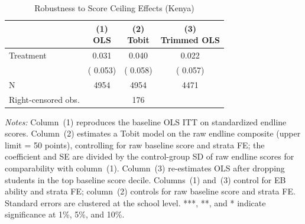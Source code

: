 \begin{table}[H]
\centering
\caption{Robustness to Score Ceiling Effects (Kenya)}
\label{tab:ceiling}
\begin{threeparttable}
\begin{tabular}[t]{lccc}
\toprule
 & \makecell{(1) \\ OLS} & \makecell{(2) \\ Tobit} & \makecell{(3) \\ Trimmed OLS} \\
\midrule
Treatment &   0.031 &   0.040 &   0.022 \\
 & (  0.053) & (  0.058) & (  0.057) \\
\addlinespace
N & 4954 & 4954 & 4471 \\
Right-censored obs. & &     176 & \\
\bottomrule
\end{tabular}
\begin{tablenotes}
\footnotesize
\item \textit{Notes:} Column~(1) reproduces the baseline OLS ITT on standardized endline scores. Column~(2) estimates a Tobit model on the raw endline composite (upper limit = 50 points), controlling for raw baseline score and strata FE; the coefficient and SE are divided by the control\mbox{-}group SD of raw endline scores for comparability with column~(1). Column~(3) re-estimates OLS after dropping students in the top baseline score decile. Columns~(1) and~(3) control for EB ability and strata FE; column~(2) controls for raw baseline score and strata FE\@. Standard errors are clustered at the school level. ***, **, and * indicate significance at 1\%, 5\%, and 10\%.
\end{tablenotes}
\end{threeparttable}
\end{table}
